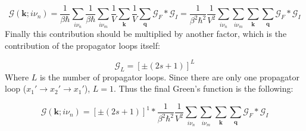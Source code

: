 \begin{equation} \label{eq:29}
\mathcal{G} \left( \boldsymbol{k}; i \nu_{n} \right)
=
\frac{1}{\beta \hbar} \sum_{i \nu_{n}}
\frac{1}{\beta \hbar} \sum_{i \nu_{m}}
\frac{1}{V} \sum_{\boldsymbol{k}}
\frac{1}{V} \sum_{\boldsymbol{q}}
\mathcal{G}_{F} * \mathcal{G}_{I}
=
\frac{1}{\beta^{2} \hbar^{2}} \frac{1}{V^{2}}
\sum_{i \nu_{n}}
\sum_{i \nu_{m}}
\sum_{\boldsymbol{k}}
\sum_{\boldsymbol{q}}
\mathcal{G}_{F} * \mathcal{G}_{I}
\end{equation}
Finally this contribution should be multiplied by another factor, which is the contribution of the propagator loops itself:

\begin{equation} \label{eq:30}
\mathcal{G}_{L}
=
\left[ \pm \left( 2s + 1 \right) \right]^{L}
\end{equation}
Where $L$ is the number of propagator loops. Since there are only one propagator loop ($x_{1}' \to x_{2}' \to x_{1}'$), $L = 1$. Thus the final Green's function is the following:

\begin{equation} \label{eq:31}
\mathcal{G} \left( \boldsymbol{k}; i \nu_{n} \right)
=
\left[ \pm \left( 2s + 1 \right) \right]^{1} *
\frac{1}{\beta^{2} \hbar^{2}} \frac{1}{V^{2}}
\sum_{i \nu_{n}}
\sum_{i \nu_{m}}
\sum_{\boldsymbol{k}}
\sum_{\boldsymbol{q}}
\mathcal{G}_{F} * \mathcal{G}_{I}
\end{equation}
